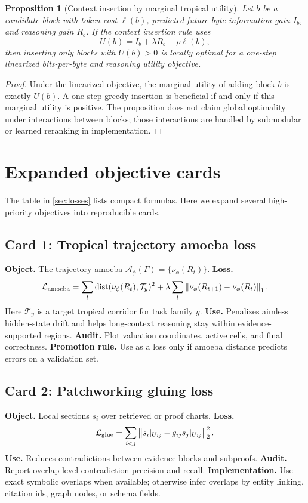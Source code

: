\documentclass[11pt]{article}
\newtheorem{proposition}[definition]{Proposition}
\newcommand{\calA}{\mathcal{A}}
\newcommand{\calL}{\mathcal{L}}
\newcommand{\calT}{\mathcal{T}}
\newcommand{\dist}{\operatorname{dist}}
\newcommand{\norm}[1]{\left\lVert #1\right\rVert}
\begin{document}
\begin{proposition}[Context insertion by marginal tropical utility]
Let \(b\) be a candidate block with token cost \(\ell(b)\), predicted future-byte information gain \(I_b\), and reasoning gain \(R_b\).  If the context insertion rule uses
\begin{equation}
U(b)=I_b+\lambda R_b-\rho\ell(b),
\end{equation}
then inserting only blocks with \(U(b)>0\) is locally optimal for a one-step linearized bits-per-byte and reasoning utility objective.
\end{proposition}

\begin{proof}
Under the linearized objective, the marginal utility of adding block \(b\) is exactly \(U(b)\).  A one-step greedy insertion is beneficial if and only if this marginal utility is positive.  The proposition does not claim global optimality under interactions between blocks; those interactions are handled by submodular or learned reranking in implementation.
\end{proof}

\section{Expanded objective cards}

The table in \cref{sec:losses} lists compact formulas.  Here we expand several high-priority objectives into reproducible cards.

\subsection*{Card 1: Tropical trajectory amoeba loss}
\textbf{Object.}  The trajectory amoeba \(\calA_\phi(\Gamma)=\{\nu_\phi(R_t)\}\).  \textbf{Loss.}
\begin{equation}
\calL_{\rm amoeba}=\sum_t\dist(\nu_\phi(R_t),\calT_y)^2+\lambda\sum_t\norm{\nu_\phi(R_{t+1})-\nu_\phi(R_t)}_1.
\end{equation}
Here \(\calT_y\) is a target tropical corridor for task family \(y\).  \textbf{Use.}  Penalizes aimless hidden-state drift and helps long-context reasoning stay within evidence-supported regions.  \textbf{Audit.}  Plot valuation coordinates, active cells, and final correctness.  \textbf{Promotion rule.}  Use as a loss only if amoeba distance predicts errors on a validation set.

\subsection*{Card 2: Patchworking gluing loss}
\textbf{Object.}  Local sections \(s_i\) over retrieved or proof charts.  \textbf{Loss.}
\begin{equation}
\calL_{\rm glue}=\sum_{i<j}\norm{s_i|_{U_{ij}}-g_{ij}s_j|_{U_{ij}}}_2^2.
\end{equation}
\textbf{Use.}  Reduces contradictions between evidence blocks and subproofs.  \textbf{Audit.}  Report overlap-level contradiction precision and recall.  \textbf{Implementation.}  Use exact symbolic overlaps when available; otherwise infer overlaps by entity linking, citation ids, graph nodes, or schema fields.
\end{document}
